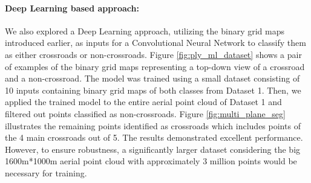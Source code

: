 \documentclass[11pt]{article}
\begin{document}
    \paragraph{Deep Learning based approach:}
    We also explored a Deep Learning approach, utilizing the binary grid maps introduced earlier, as inputs for a
    Convolutional Neural Network to classify them as either crossroads or non-crossroads. Figure \ref{fig:ply_ml_dataset}
    shows a pair of examples of the binary grid maps representing a top-down view of a crossroad and a non-crossroad.
    The model was trained using a small dataset consisting of 10 inputs containing binary grid maps of both classes
    from Dataset 1. Then, we applied the trained model to the entire aerial point cloud of Dataset 1 and filtered out
    points classified as non-crossroads. Figure \ref{fig:multi_plane_seg} illustrates the remaining points identified
    as crossroads which includes points of the 4 main crossroads out of 5. The results demonstrated excellent performance.
    However, to ensure robustness, a significantly larger dataset considering the big 1600m*1000m aerial point cloud
    with approximately 3 million points would be necessary for training.
\end{document}

